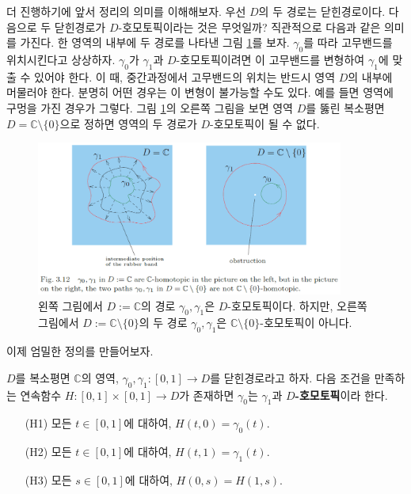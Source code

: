 더 진행하기에 앞서 정리의 의미를 이해해보자.
우선 $D$의 두 경로는 닫힌경로이다.
다음으로 두 닫힌경로가 $D$-호모토픽이라는 것은 무엇일까?
직관적으로 다음과 같은 의미를 가진다.
한 영역의 내부에 두 경로를 나타낸 그림 \ref{fig-3-12}를 보자.
$\gamma_0$를 따라 고무밴드를 위치시킨다고 상상하자.
$\gamma_0$가 $\gamma_1$과 $D$-호모토픽이려면
이 고무밴드를 변형하여 $\gamma_1$에 맞출 수 있어야 한다.
이 때, 중간과정에서 고무밴드의 위치는 반드시 영역 $D$의 내부에 머물러야 한다.
분명히 어떤 경우는 이 변형이 불가능할 수도 있다. 
예를 들면 영역에 구멍을 가진 경우가 그렇다.
그림 \ref{fig-3-12}의 오른쪽 그림을 보면 
영역 $D$를 뚫린 복소평면 $D=\mathbb C\setminus \{0\}$으로 정하면
영역의 두 경로가 $D$-호모토픽이 될 수 없다.

\begin{figure}[!h]
\begin{center}
\includegraphics[width=0.9\textwidth]{./SaltChapter/fig-3-12}
\end{center}
\caption{왼쪽 그림에서 $D:=\mathbb C$의 경로 $\gamma_0, \gamma_1$은 $D$-호모토픽이다.
하지만, 오른쪽 그림에서 $D:=\mathbb C\setminus\{0\}$의 두 경로
$\gamma_0, \gamma_1$은 $\mathbb C\setminus\{0\}$-호모토픽이 아니다.}
\label{fig-3-12}
\end{figure}

이제 엄밀한 정의를 만들어보자.

\begin{saltdefinition}{}{} \label{def-3-3}
$D$를 복소평면 $\mathbb C$의 영역,
$\gamma_0, \gamma_1 : [0,1] \to D$를 닫힌경로라고 하자.
다음 조건을 만족하는 연속함수 $H:[0,1]\times[0,1]\to D$가 존재하면
$\gamma_0$는 $\gamma_1$과 {\bf $D$-호모토픽}이라 한다.
\begin{itemize}
\item[(H1)] 모든 $t\in [0,1]$에 대하여, $H(t,0)=\gamma_0(t)$.
\item[(H2)] 모든 $t\in [0,1]$에 대하여, $H(t,1)=\gamma_1(t)$.
\item[(H3)] 모든 $s\in [0,1]$에 대하여, $H(0,s)=H(1,s)$.
\end{itemize}
\end{saltdefinition}

